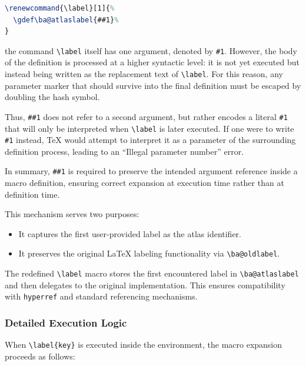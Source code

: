 \begin{lstlisting}[language=LaTeX]
\renewcommand{\label}[1]{%
  \gdef\ba@atlaslabel{##1}%
}
\end{lstlisting}

the command \lstinline|\label| itself has one argument, denoted by \lstinline|#1|. However, the body of the definition is processed at a higher syntactic level: it is not yet executed but instead being written as the replacement text of \lstinline|\label|. For this reason, any parameter marker that should survive into the final definition must be escaped by doubling the hash symbol.

Thus, \lstinline|##1| does not refer to a second argument, but rather encodes a literal \lstinline|#1| that will only be interpreted when \lstinline|\label| is later executed. If one were to write \lstinline|#1| instead, TeX would attempt to interpret it as a parameter of the surrounding definition process, leading to an ``Illegal parameter number'' error.

In summary, \lstinline|##1| is required to preserve the intended argument reference inside a macro definition, ensuring correct expansion at execution time rather than at definition time.

This mechanism serves two purposes:

\begin{itemize}
\item It captures the first user-provided label as the atlas identifier.
\item It preserves the original \LaTeX{} labeling functionality via \lstinline|\ba@oldlabel|.
\end{itemize}

The redefined \lstinline|\label| macro stores the first encountered label in \lstinline|\ba@atlaslabel| and then delegates to the original implementation. This ensures compatibility with \texttt{hyperref} and standard referencing mechanisms.

\subsubsection{Detailed Execution Logic}

When \lstinline|\label{key}| is executed inside the environment, the macro expansion proceeds as follows:

